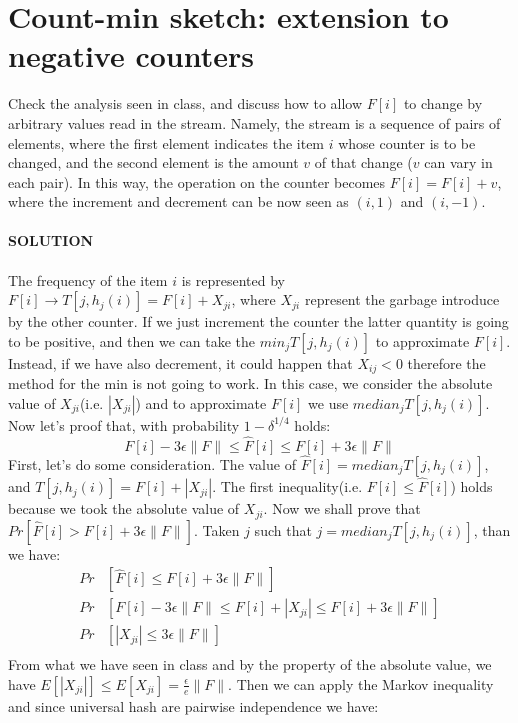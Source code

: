 \documentclass[a4paper]{article}
\begin{document}
\section*{Count-min sketch: extension to negative counters}
Check the analysis seen in class, and discuss how to allow $F[i]$ to change by arbitrary values read in the stream. Namely, the stream is a sequence of pairs of elements, where the first element indicates the item $i$ whose counter is to be changed, and the second element is the amount $v$ of that change ($v$ can vary in each pair). In this way, the operation on the counter becomes $F[i] = F[i]+v$, where the increment and decrement can be now seen as $(i, 1)$ and $(i, −1)$.
\\
\\
\textbf{SOLUTION}
\\
\\
The frequency of the item $i$ is represented by $F[i]\rightarrow T[j,h_j(i)]= F[i] + X_{ji}$, where $X_{ji}$ represent the garbage introduce by the other counter. If we just increment the counter the latter quantity is going to be positive, and then we can take the $min_j T[j,h_j(i)]$ to approximate $F[i]$.
Instead, if we have also decrement, it could happen that $X_{ij}<0$ therefore the method for the min is not going to work. In this case, we consider the absolute value of $X_{ji}$(i.e. $|X_{ji}|$) and to approximate $F[i]$ we use $median_j T[j, h_j(i)]$. Now let's proof that, with probability $1-\delta^{1/4}$ holds:
\begin{equation}
F[i] - 3\epsilon \|F\|\leq \hat{F}[i] \leq F[i]  + 3\epsilon \|F\|
\nonumber
\end{equation}
First, let's do some consideration. The value of $\hat{F}[i]=median_j T[j, h_j(i)]$, and $T[j, h_j(i)]= F[i] +|X_{ji}| $. The first inequality(i.e. $F[i] \leq \hat{F}[i]$) holds because we took the absolute value of $X_{ji}$. Now we shall prove that $Pr[\hat{F}[i]> F[i]  + 3\epsilon \|F\|]$. Taken $j$ such that $j=median_j T[j, h_j(i)]$, than we have:
\begin{align*}
Pr&[\hat{F}[i] \leq F[i]  + 3\epsilon \|F\|]\\
Pr&[F[i] - 3\epsilon \|F\|\leq F[i] +|X_{ji}| \leq F[i]  + 3\epsilon \|F\|]\\
Pr&[|X_{ji}|\leq 3\epsilon \|F\|]\\
\end{align*}
From what we have seen in class and by the property of the absolute value, we have $E[|X_{ji}|]\leq E[X_{ji}]= \frac{\epsilon}{e} \|F\|$. Then we can apply the Markov inequality and since universal hash are pairwise independence we have:
\end{document}

